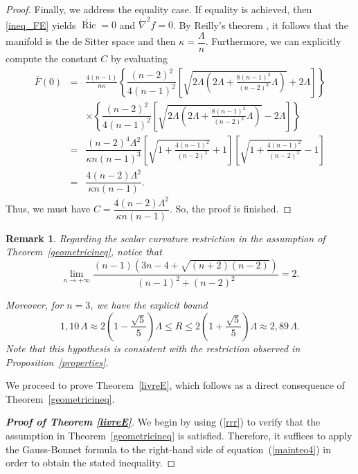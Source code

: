 \documentclass{amsart}
\newtheorem{remark}{Remark}
\numberwithin{equation}{section}
\begin{document}
\begin{proof}
Finally, we address the equality case. If equality is achieved, then \eqref{ineq_FE} yields $\mathring{\operatorname{Ric}} = 0$ and $\mathring{\nabla}^{2}f = 0$. By Reilly's theorem \cite{reilly2}, it follows that the manifold is the de Sitter space and then $\kappa = \dfrac{\Lambda}{n}$.	Furthermore, we can explicitly compute the constant $C$ by evaluating
\begin{eqnarray*}
	\overline{F}(0) &=& \frac{4(n-1)}{n\kappa}\left\{  \dfrac{(n-2)^2}{4(n - 1)^2}\left[\sqrt{2\Lambda\left(2\Lambda + \frac{8(n-1)^2}{(n-2)^3}\Lambda\right)} + 2\Lambda\right]\right\} \\
	&& \times\left\{\dfrac{(n-2)^2}{4(n - 1)^2}\left[\sqrt{2\Lambda\left(2\Lambda + \frac{8(n-1)^2}{(n-2)^3}\Lambda\right)} - 2\Lambda\right] \right\} \\
	&=& \dfrac{(n-2)^4\Lambda^2}{\kappa n(n - 1)^3} \left[\sqrt{1 + \frac{4(n-1)^2}{(n-2)^3}} + 1\right]\left[\sqrt{1 + \frac{4(n-1)^2}{(n-2)^3}} - 1\right] \\
	&=& \dfrac{4(n-2)\Lambda^2}{\kappa n(n - 1)}.
\end{eqnarray*} Thus, we must have $C = \dfrac{4(n-2)\Lambda^2}{\kappa n(n - 1)}$. So, the proof is finished. 

\end{proof}



\begin{remark}
\label{about_limit}
	Regarding the scalar curvature restriction in the assumption of Theorem~\ref{geometricineq}, notice that
	\[
	\lim_{n \to +\infty} \frac{(n-1) \left( 3n - 4 + \sqrt{(n+2)(n-2)} \right)}{(n-1)^2 + (n-2)^2} = 2.
	\]
	
	Moreover, for \( n = 3 \), we have the explicit bound
	\[
	1,10\,\Lambda\approx	2 \left( 1 - \frac{\sqrt{5}}{5} \right) \Lambda \leq R \leq 2 \left( 1 + \frac{\sqrt{5}}{5} \right) \Lambda \approx 2,89\,\Lambda.
	\]
	Note that this hypothesis is consistent with the restriction observed in Proposition~\ref{properties}.
\end{remark}	


We proceed to prove Theorem~\ref{livreE}, which follows as a direct consequence of Theorem~\ref{geometricineq}.


\begin{proof}[{\bf Proof of Theorem \ref{livreE}}]
We begin by using (\ref{rrr}) to verify that the assumption in Theorem~\ref{geometricineq} is satisfied. Therefore, it suffices to apply the Gauss-Bonnet formula to the right-hand side of equation~(\ref{mainteo4}) in order to obtain the stated inequality.  
\end{proof}
\end{document}
